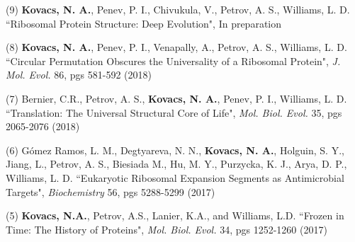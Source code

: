 

\begin{cvpublications}


\cvpublication
{(9) \textbf{Kovacs, N. A.}, Penev, P. I., Chivukula, V., Petrov, A. S., Williams, L. D. ``Ribosomal Protein Structure: Deep Evolution", In preparation}
\vspace{-4.0mm}


{(8) \textbf{Kovacs, N. A.}, Penev, P. I., Venapally, A., Petrov, A. S., Williams, L. D. ``Circular Permutation Obscures the Universality of a Ribosomal Protein", \textit{J. Mol. Evol.} 86, pgs 581-592 (2018)}


{(7) Bernier, C.R., Petrov, A. S., \textbf{Kovacs, N. A.},  Penev, P. I., Williams, L. D. ``Translation: The Universal Structural Core of Life", \textit{Mol. Biol. Evol.} 35, pgs 2065-2076 (2018)}


{(6) G{\'o}mez Ramos, L. M., Degtyareva, N. N., \textbf{Kovacs, N. A.}, Holguin, S. Y., Jiang, L., Petrov, A. S., Biesiada M., Hu, M. Y., Purzycka, K. J., Arya, D. P., Williams, L. D. ``Eukaryotic Ribosomal Expansion Segments as Antimicrobial Targets", \textit{Biochemistry} 56, pgs 5288-5299 (2017)}


\cvpublication
{(5) \textbf{Kovacs, N.A.}, Petrov, A.S., Lanier, K.A., and Williams, L.D. ``Frozen in Time: The History of Proteins", \textit{Mol. Biol. Evol.} 34, pgs 1252-1260 (2017)}
\vspace{-4.0mm}


\end{cvpublications}
